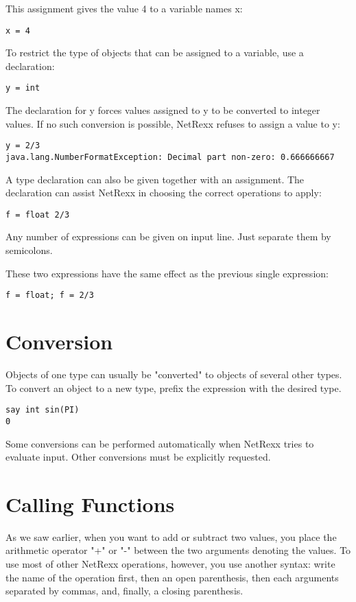 This assignment gives the value 4 to a variable names x:
\begin{verbatim}
x = 4
\end{verbatim}
To restrict the type of objects that can be assigned to a variable, use a declaration:

\begin{verbatim}
y = int
\end{verbatim}
The declaration for y forces values assigned to y to be converted to integer values. If no such conversion is possible, NetRexx refuses to assign a value to y:

\begin{verbatim}
y = 2/3
java.lang.NumberFormatException: Decimal part non-zero: 0.666666667
\end{verbatim}
A type declaration can also be given together with an assignment. The declaration can assist NetRexx in choosing the correct operations to apply:

\begin{verbatim}
f = float 2/3
\end{verbatim}
Any number of expressions can be given on input line. Just separate them by semicolons.

These two expressions have the same effect as the previous single expression:

\begin{verbatim}
f = float; f = 2/3
\end{verbatim}
 \section{Conversion}

Objects of one type can usually be "converted" to objects of several other types. To convert an object to a new type, prefix the expression with the desired type.
\begin{verbatim}
say int sin(PI)
0
\end{verbatim}
Some conversions can be performed automatically when NetRexx tries to evaluate input. Other conversions must be explicitly requested.

\section{Calling Functions}

As we saw earlier, when you want to add or subtract two values, you place the arithmetic operator "+" or "-" between the two arguments denoting the values. To use most of other NetRexx operations, however, you use another syntax: write the name of the operation first, then an open parenthesis, then each arguments separated by commas, and, finally, a closing parenthesis.


